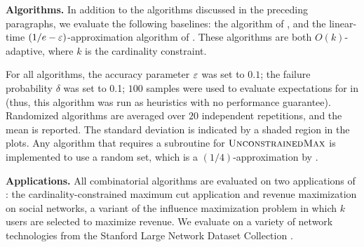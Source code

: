 
\textbf{Algorithms.}
In addition to the algorithms discussed in the preceding
paragraphs, we evaluate the following baselines:
the \iter algorithm of ,
and the linear-time $(1/e - \varepsilon)$-approximation algorithm \frg of .
These algorithms are both $O(k)$-adaptive, where $k$ is the cardinality constraint.
%

For all algorithms, the accuracy parameter $\varepsilon$ was set to $0.1$; 
the failure probability $\delta$ was set to 0.1;
$100$ samples
were used to evaluate expectations for \thresam in \anm (thus, this
algorithm was run as heuristics with no performance guarantee). 
Randomized algorithms are averaged over $20$ independent repetitions,
and the mean is reported. The standard deviation is indicated by a shaded
region in the plots. Any algorithm that requires a subroutine for $\textsc{UnconstrainedMax}$
is implemented to use a random set, which is a $(1/4)$-approximation by
.  

\textbf{Applications.} All combinatorial algorithms are evaluated on two applications
of \sm: the cardinality-constrained maximum cut application and revenue maximization
on social networks, a variant of the influence maximization problem in which $k$ users
are selected to maximize revenue. 
We evaluate on a variety of network technologies from
the Stanford Large Network Dataset Collection \cite{snapnets}.

